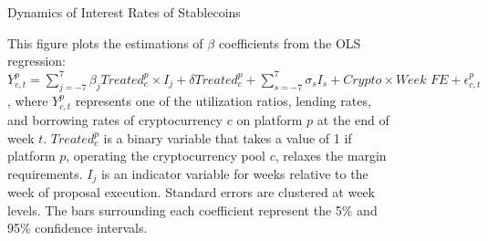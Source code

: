 \clearpage
\newpage



\begin{figure}[ht!]
\centering
\caption{Dynamics of Interest Rates of Stablecoins}\label{fig:dynamics_interestrates}
\caption*{This figure plots the estimations of $\beta$ coefficients from the OLS regression: $ Y_{c,t}^p=\sum_{j=-7}^{7}\beta_jTreated_{c}^p\times I_j+\delta Treated_{c}^p+\sum_{s=-7}^{7}\sigma_sI_s+ \textit{Crypto}\times\textit{Week FE}+\epsilon_{c,t}^p$, where $Y_{c,t}^p$ represents one of the utilization ratios, lending rates, and borrowing rates of cryptocurrency $c$ on platform $p$ at the end of week $t$. $Treated_{c}^{p}$ is a binary variable that takes a value of 1 if platform $p$, operating the cryptocurrency pool $c$, relaxes the margin requirements. $I_j$ is an indicator variable for weeks relative to the week of proposal execution. Standard errors are clustered at week levels. The bars surrounding each coefficient represent the 5\% and 95\% confidence intervals. }

\bigskip


\end{figure}



